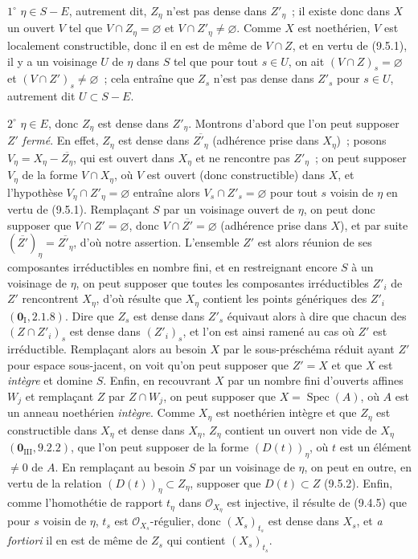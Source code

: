 $1^\circ$ $\eta\in S-E$, autrement dit, $Z_\eta$ n'est pas dense dans
$Z'_\eta$~; il existe donc dans $X$ un ouvert $V$ tel que
$V\cap Z_\eta=\varnothing$ et $V\cap Z'_\eta\neq\varnothing$. Comme $X$ est
noethérien, $V$ est localement constructible, donc il en est de même de
$V\cap Z$, et en vertu de (9.5.1), il y a un voisinage $U$ de $\eta$ dans $S$
tel que pour tout $s\in U$, on ait $(V\cap Z)_s=\varnothing$ et
$(V\cap Z')_s\neq\varnothing$~; cela entraîne que $Z_s$ n'est pas dense dans
$Z'_s$ pour $s\in U$, autrement dit $U\subset S-E$.


$2^\circ$ $\eta\in E$, donc $Z_\eta$ est dense dans $Z'_\eta$. Montrons
d'abord que l'on peut supposer $Z'$ \emph{fermé}. En effet, $Z_\eta$ est dense
dans $\overline{Z'_\eta}$ (adhérence prise dans $X_\eta$)~; posons
$V_\eta=X_\eta-\overline{Z_\eta}$, qui est ouvert dans $X_\eta$ et ne
rencontre pas $Z'_\eta$~; on peut supposer $V_\eta$ de la forme $V\cap X_\eta$,
où $V$ est ouvert (donc constructible) dans $X$, et l'hypothèse
$V_\eta\cap Z'_\eta=\varnothing$ entraîne alors
$V_s\cap Z'_s=\varnothing$ pour tout $s$ voisin de $\eta$ en vertu de (9.5.1).
Remplaçant $S$ par un voisinage ouvert de $\eta$, on peut donc supposer que
$V\cap Z'=\varnothing$, donc $V\cap\overline{Z'}=\varnothing$ (adhérence prise
dans $X$), et par suite $(\overline{Z'})_\eta=\overline{Z'_\eta}$, d'où notre
assertion. L'ensemble $Z'$ est alors réunion de ses composantes irréductibles
en nombre fini, et en restreignant encore $S$ à un voisinage de $\eta$, on
peut supposer que toutes les composantes irréductibles $Z'_i$ de $Z'$
rencontrent $X_\eta$, d'où résulte que $X_\eta$ contient les points génériques
des $Z'_i$ $(\mathbf 0_{\mathrm I},2.1.8)$. Dire que $Z_s$ est dense dans
$Z'_s$ équivaut alors à dire que chacun des $(Z\cap Z'_i)_s$ est dense dans
$(Z'_i)_s$, et l'on est ainsi ramené au cas où $Z'$ est irréductible.
Remplaçant alors au besoin $X$ par le sous-préschéma réduit ayant $Z'$ pour
espace sous-jacent, on voit qu'on peut supposer que $Z'=X$ et que $X$ est
\emph{intègre} et domine $S$. Enfin, en recouvrant $X$ par un nombre fini
d'ouverts affines $W_j$ et remplaçant $Z$ par $Z\cap W_j$, on peut supposer
que $X=\operatorname{Spec}(A)$, où $A$ est un anneau noethérien \emph{intègre}.
Comme $X_\eta$ est noethérien intègre et que $Z_\eta$ est constructible dans
$X_\eta$ et dense dans $X_\eta$, $Z_\eta$ contient un ouvert non vide de
$X_\eta$ $(\mathbf 0_{\mathrm{III}},9.2.2)$, que l'on peut supposer de la forme
$(D(t))_\eta$, où $t$ est un élément $\neq0$ de $A$. En remplaçant au besoin
$S$ par un voisinage de $\eta$, on peut en outre, en vertu de la relation
$(D(t))_\eta\subset Z_\eta$, supposer que $D(t)\subset Z$ (9.5.2). Enfin,
comme l'homothétie de rapport $t_\eta$ dans $\mathcal O_{X_\eta}$ est
injective, il résulte de (9.4.5) que pour $s$ voisin de $\eta$, $t_s$ est
$\mathcal O_{X_s}$-régulier, donc $(X_s)_{t_s}$ est dense dans $X_s$, et
\emph{a fortiori} il en est de même de $Z_s$ qui contient $(X_s)_{t_s}$.


